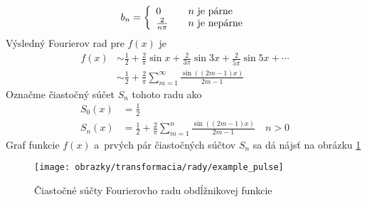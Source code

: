 \begin{priklad}
    \begin{equation*}
        b_n = \left\{
                \begin{array}{l l}
                    0 \quad & n \text{ je párne} \\
                    \frac{2}{n\pi}  \quad &n \text{ je nepárne}
                \end{array}
            \right.
    \end{equation*}
%
    Výsledný Fourierov rad pre $f(x)$ je 
    \begin{equation*}
    \begin{split}
        f(x) &\sim \frac{1}{2} + \frac{2}{\pi} \sin x + \frac{2}{3\pi}
            \sin 3x + \frac{2}{5\pi} \sin 5x + \cdots \\
            &\sim \frac{1}{2} + \frac{2}{\pi} \sum_{m=1}^{\infty}
                \frac{\sin\left( (2m-1) x\right)}{2m-1}
    \end{split}
    \end{equation*}
%
    Označme čiastočný súčet $S_n$ tohoto radu ako 
    \begin{equation*}
    \begin{split}
        S_0(x) &= \frac{1}{2} \\
        S_n(x) &= \frac{1}{2} + \frac{2}{\pi} \sum_{m=1}^{n}
                \frac{\sin\left( (2m-1) x\right)}{2m-1} \quad n>0
    \end{split}
    \end{equation*}
    Graf funkcie $f(x)$ a~prvých pár čiastočných súčtov $S_n$ sa dá
    nájsť na obrázku \ref{fig:example_pulse}

    \begin{figure}[htp]
        \centering
        \texttt{[image: obrazky/transformacia/rady/example\_pulse]}
        \caption{Čiastočné súčty Fourierovho radu obdĺžnikovej funkcie}
        \label{fig:example_pulse}
    \end{figure}    
    \label{priklad:fourier_series_rect}
\end{priklad}

